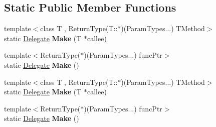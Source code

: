 \subsection*{Static Public Member Functions}
\begin{DoxyCompactItemize}
\item 
{\footnotesize template$<$class T , Return\+Type(\+T\+::$\ast$)(\+Param\+Types...) T\+Method$>$ }\\static \hyperlink{class_ensum_1_1_utils_1_1_delegate}{Delegate} {\bfseries Make} (T $\ast$callee)\hypertarget{class_ensum_1_1_utils_1_1_delegate_3_01_return_type_07_param_types_8_8_8_08_4_a55c46806e8372852550f6ae7326140fc}{}\label{class_ensum_1_1_utils_1_1_delegate_3_01_return_type_07_param_types_8_8_8_08_4_a55c46806e8372852550f6ae7326140fc}

\item 
{\footnotesize template$<$Return\+Type($\ast$)(\+Param\+Types...) func\+Ptr$>$ }\\static \hyperlink{class_ensum_1_1_utils_1_1_delegate}{Delegate} {\bfseries Make} ()\hypertarget{class_ensum_1_1_utils_1_1_delegate_3_01_return_type_07_param_types_8_8_8_08_4_a9c39a6686ddf93ac1255d9f482844a52}{}\label{class_ensum_1_1_utils_1_1_delegate_3_01_return_type_07_param_types_8_8_8_08_4_a9c39a6686ddf93ac1255d9f482844a52}

\item 
{\footnotesize template$<$class T , Return\+Type(\+T\+::$\ast$)(\+Param\+Types...) T\+Method$>$ }\\static \hyperlink{class_ensum_1_1_utils_1_1_delegate}{Delegate} {\bfseries Make} (T $\ast$callee)\hypertarget{class_ensum_1_1_utils_1_1_delegate_3_01_return_type_07_param_types_8_8_8_08_4_a55c46806e8372852550f6ae7326140fc}{}\label{class_ensum_1_1_utils_1_1_delegate_3_01_return_type_07_param_types_8_8_8_08_4_a55c46806e8372852550f6ae7326140fc}

\item 
{\footnotesize template$<$Return\+Type($\ast$)(\+Param\+Types...) func\+Ptr$>$ }\\static \hyperlink{class_ensum_1_1_utils_1_1_delegate}{Delegate} {\bfseries Make} ()\hypertarget{class_ensum_1_1_utils_1_1_delegate_3_01_return_type_07_param_types_8_8_8_08_4_a9c39a6686ddf93ac1255d9f482844a52}{}\label{class_ensum_1_1_utils_1_1_delegate_3_01_return_type_07_param_types_8_8_8_08_4_a9c39a6686ddf93ac1255d9f482844a52}

\end{DoxyCompactItemize}

